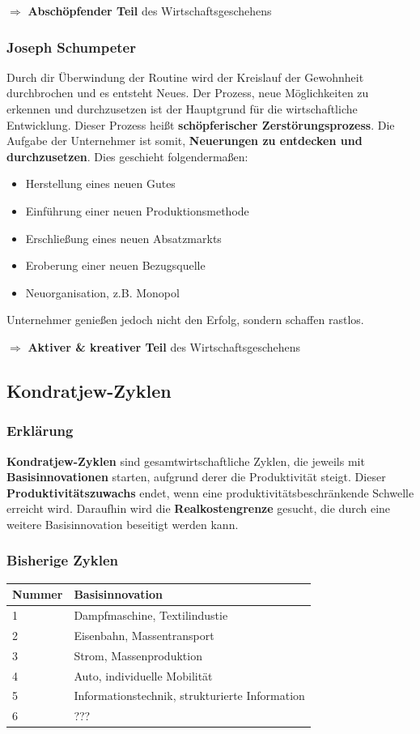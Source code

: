 \documentclass[titlepage,parskip=half]{scrartcl}
\begin{document}
$\Rightarrow$ \textbf{Abschöpfender Teil} des Wirtschaftsgeschehens


\subsubsection{Joseph Schumpeter}
Durch dir Überwindung der Routine wird der Kreislauf der Gewohnheit durchbrochen und es entsteht Neues. Der Prozess, neue Möglichkeiten zu erkennen und durchzusetzen ist der Hauptgrund für die wirtschaftliche Entwicklung. Dieser Prozess heißt \textbf{schöpferischer Zer\-stö\-rungs\-pro\-zess}. Die Aufgabe der Unternehmer ist somit, \textbf{Neuerungen zu entdecken und durchzusetzen}. Dies geschieht folgendermaßen:

\begin{itemize}
    \item Herstellung eines neuen Gutes
    \item Einführung einer neuen Produktionsmethode
    \item Erschließung eines neuen Absatzmarkts
    \item Eroberung einer neuen Bezugsquelle
    \item Neuorganisation, z.B. Monopol
\end{itemize}
Unternehmer genießen jedoch nicht den Erfolg, sondern schaffen rastlos.

$\Rightarrow$ \textbf{Aktiver \& kreativer Teil} des Wirtschaftsgeschehens


\subsection{Kondratjew-Zyklen}
\subsubsection{Erklärung}
\textbf{Kondratjew-Zyklen} sind gesamtwirtschaftliche Zyklen, die jeweils mit \textbf{Basisinnovationen} starten, aufgrund derer die Produktivität steigt. Dieser \textbf{Produktivitätszuwachs} endet, wenn eine produktivitätsbeschränkende Schwelle erreicht wird. Daraufhin wird die \textbf{Realkostengrenze} gesucht, die durch eine weitere Basisinnovation beseitigt werden kann.

\subsubsection{Bisherige Zyklen}
\begin{tabular}{|l|l|} \hline
    Nummer & Basisinnovation \\ \hline
    1 & Dampfmaschine, Textilindustie \\ \hline
    2 & Eisenbahn, Massentransport \\ \hline
    3 & Strom, Massenproduktion \\ \hline
    4 & Auto, individuelle Mobilität \\ \hline
    5 & Informationstechnik, strukturierte Information \\ \hline
    6 & ??? \\ \hline
\end{tabular}
\end{document}
